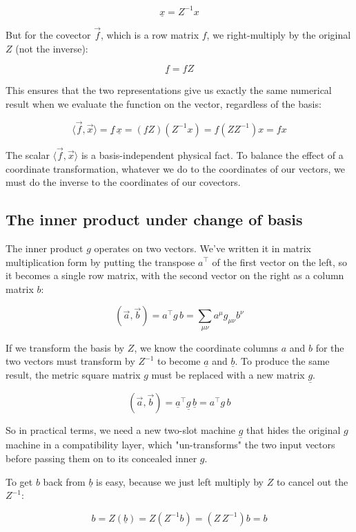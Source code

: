 $$
\underline{x} = Z^{-1} x
$$

But for the covector $\vec{f}$, which is a row matrix $f$, we right-multiply by the original $Z$ (not the inverse):

$$
\underline{f} = f Z
$$

This ensures that the two representations give us exactly the same numerical result when we evaluate the function on the vector, regardless of the basis:

$$
\langle \vec{f}, \vec{x} \rangle = \underline{f} \, \underline{x} = (f Z) (Z^{-1} x) = f (Z Z^{-1}) x = fx
$$

The scalar $\langle \vec{f}, \vec{x} \rangle$ is a basis-independent physical fact. To balance the effect of a coordinate transformation, whatever we do to the coordinates of our vectors, we must do the inverse to the coordinates of our covectors.

\subsection{The inner product under change of basis}

The inner product $g$ operates on two vectors. We've written it in matrix multiplication form by putting the transpose $a^\intercal$ of the first vector on the left, so it becomes a single row matrix, with the second vector on the right as a column matrix $b$:

$$
(\vec{a}, \vec{b}) = a^\intercal g\, b = \sum_{\mu\nu} a^{\mu} g_{\mu\nu} b^{\nu}
$$

If we transform the basis by $Z$, we know the coordinate columns $a$ and $b$ for the two vectors must transform by $Z^{-1}$ to become $\underline{a}$ and $\underline{b}$. To produce the same result, the metric square matrix $g$ must be replaced with a new matrix $\underline{g}$. 

$$
(\vec{a}, \vec{b}) = \underline{a}^\intercal \underline{g}\, \underline{b} = a^\intercal g\, b
$$

So in practical terms, we need a new two-slot machine $\underline{g}$ that hides the original $g$ machine in a compatibility layer, which "un-transforms" the two input vectors before passing them on to its concealed inner $g$.

To get $b$ back from $\underline{b}$ is easy, because we just left multiply by $Z$ to cancel out the $Z^{-1}$:

$$
b = Z(\underline{b}) = Z(Z^{-1}b) = (Z\,Z^{-1})b = b
$$

